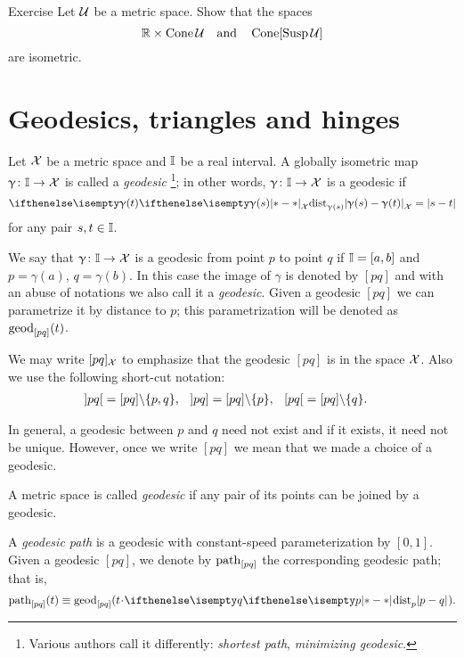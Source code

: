 \begin{thm}{Exercise}\label{ex:product-cone}
Let $\mathcal{U}$ be a metric space.
Show that the spaces 
\[\RR\times \Cone\spc{U}\quad\text{and}\quad\Cone[\Susp\spc{U}]\]
are  isometric.
\end{thm}




\section{Geodesics, triangles and hinges}
\label{sec:geods}

Let $\mathcal{X}$ be a metric space 
and $\II$\index{$\II$} be a real interval. 
A globally isometric map $\gamma\:\II\to \spc{X}$ is called a \emph{geodesic}%
\footnote{Various authors call it differently: {}\emph{shortest path}, {}\emph{minimizing geodesic}.}; 
in other words, $\gamma\:\II\to \spc{X}$ is a geodesic if 
\[\dist{\gamma(s)}{\gamma(t)}{\spc{X}}=|s-t|\]
for any pair $s,t\in \II$.

We say that  $\gamma\:\II\to \spc{X}$ is a geodesic from point $p$ to point $q$ if 
$\mathbb{I}=[a,b]$ and $p=\gamma(a)$, $q=\gamma(b)$. 
In this case the image of $\gamma$ is denoted by $[p q]$\index{$[{*}{*}]$} and with an abuse of notations  we also call it a \emph{geodesic}.
Given a geodesic $[pq]$ we can parametrize it by distance to $p$;
this parametrization will be denoted as $\mathrm{geod}_{[p q]}(t)$.


We may write $[p q]_{\mathcal{X}}$ 
to emphasize that the geodesic $[p q]$ is in the space  ${\mathcal{X}}$.
Also we use the following short-cut notation:
\begin{align*}
\hskip-0.1em\left] p q \right[&=[pq]\backslash\{p,q\},
&
\hskip-0.1em\left] p q \right]&=[pq]\backslash\{p\},
&
\hskip-0.1em\left[ p q \right[&=[pq]\backslash\{q\}.
\end{align*}



In general, a geodesic between $p$ and $q$ need not exist and if it exists, it need not  be unique.  However,  once we write $[p q]$ we mean that we made a choice of a geodesic.

A metric space is called \emph{geodesic} if any pair of its points can be joined by a geodesic. 


A \emph{geodesic path} is a geodesic with constant-speed parameterization by $[0,1]$.
Given a geodesic $[p q]$,
we denote by $\mathrm{path}_{[pq]}$ the corresponding geodesic path;
that is,
$$\geodpath_{[pq]}(t)\z\equiv\geod_{[pq]}(t\cdot\dist[{{}}]{p}{q}{}).$$

